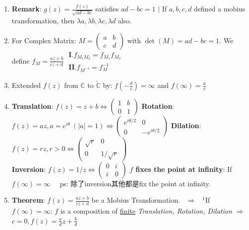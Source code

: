 \documentclass[9pt]{article}
\begin{document}
\begin{enumerate}[itemsep=-2pt, topsep=-2pt]
    \item \textbf{Remark}: $g(z)=\frac{f(z)}{\sqrt{ad-bc}}$ satisfies $ad-bc=1$ \quad $\big|$ \quad If $a,b,c,d$ defined a mobius transformation, then $\lambda a,\lambda b,\lambda c,\lambda d$ also.
    \item For Complex Matrix: $M=\begin{pmatrix}a & b \\ c & d\end{pmatrix}$ with $\det(M) = ad-bc=1$. \quad We define $f_{M}=\frac{az+b}{cz+d}$ \qquad $\begin{matrix}\textbf{I}. f_{M_1M_2}=f_{M_1}f_{M_2} \\ \textbf{II}. f_{M^{-1}}=f_M^{-1} \qquad \end{matrix}$
    \item Extended $f(z)$ from $\mathbb{C}$ to $\widetilde{\mathbb{C}}$ by: $f(-\frac{d}{c})=\infty$ and $f(\infty)=\frac{a}{c}$
    \item {\footnotesize \textbf{Translation}: $f(z)=z+b\Leftrightarrow \begin{pmatrix}1 & b \\ 0 & 1\end{pmatrix}$ \quad \textbf{Rotation}: $f(z)=az,a=e^{i\theta} \ (|a|=1)\Leftrightarrow \begin{pmatrix}e^{i\theta/2} & 0 \\ 0 & -e^{i\theta/2}\end{pmatrix}$ \quad \textbf{Dilation}: $f(z)=rz,r>0 \Leftrightarrow \begin{pmatrix}\sqrt{r} & 0 \\ 0 & 1/\sqrt{r}\end{pmatrix}$} \\
    {\footnotesize \textbf{Inversion}: $f(z)=1/z \Leftrightarrow \begin{pmatrix}0 & i \\ i & 0\end{pmatrix}$ \quad \textbf{$f$ fixes the point at infinity}: If $f(\infty)=\infty$ \ \ {\scriptsize ps: 除了inversion其他都是fix the point at infinity.}}
    \item {\footnotesize \textbf{Theorem}: $f(z)=\frac{az+b}{cz+d}$ be a Mobius Transformation. \ $\Rightarrow$ \ $^1$If $f(\infty)=\infty$: $f$ is a composition of \underline{finite} \textit{Translation, Rotation, Dilation} $\Rightarrow$ $c=0,f(z)=\frac{a}{d}z+\frac{b}{d}$}
\end{enumerate}
\end{document}
